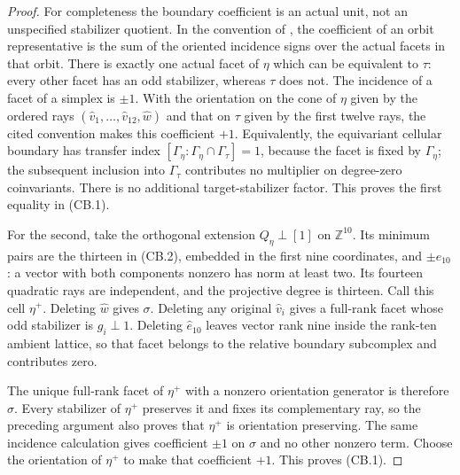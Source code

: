\documentclass[11pt,a4paper]{article}
\theoremstyle{definition}
\begin{document}
\begin{proof}
For completeness the boundary coefficient is an actual unit,
not an unspecified stabilizer quotient. In the convention of
\cite[\S1.2.1, equations~(1)--(2), p.~4]{DEKM2026}, the coefficient
of an orbit representative is the sum of the oriented incidence
signs over the actual facets in that orbit. There is exactly one
actual facet of $\eta$ which can be equivalent to $\tau$: every
other facet has an odd stabilizer, whereas $\tau$ does not.
The incidence of a facet of a simplex is $\pm1$. With the
orientation on the cone of $\eta$ given by the ordered rays
$(\widehat v_1,\ldots,\widehat v_{12},\widehat w)$ and that on
$\tau$ given by the first twelve rays, the cited convention
makes this coefficient $+1$. Equivalently, the equivariant
cellular boundary has transfer index
$[\Gamma_\eta:\Gamma_\eta\cap\Gamma_\tau]=1$, because the facet
is fixed by $\Gamma_\eta$; the subsequent inclusion into
$\Gamma_\tau$ contributes no multiplier on degree-zero
coinvariants. There is no additional target-stabilizer factor.
This proves the first equality in (CB.1).

For the second, take the orthogonal extension
$Q_\eta\perp[1]$ on $\mathbb Z^{10}$. Its minimum pairs are
the thirteen in (CB.2), embedded in the first nine coordinates,
and $\pm e_{10}$: a vector with both components nonzero has
norm at least two. Its fourteen quadratic rays are independent,
and the projective degree is thirteen. Call this cell $\eta^+$.
Deleting $\widehat w$ gives $\sigma$. Deleting any original
$\widehat v_i$ gives a full-rank facet whose odd stabilizer is
$g_i\perp1$. Deleting $\widehat e_{10}$ leaves vector rank nine
inside the rank-ten ambient lattice, so that facet belongs to
the relative boundary subcomplex and contributes zero.

The unique full-rank facet of $\eta^+$ with a nonzero orientation
generator is therefore $\sigma$. Every stabilizer of $\eta^+$
preserves it and fixes its complementary ray, so the preceding
argument also proves that $\eta^+$ is orientation preserving.
The same incidence calculation gives coefficient $\pm1$ on
$\sigma$ and no other nonzero term. Choose the orientation of
$\eta^+$ to make that coefficient $+1$. This proves (CB.1).
\end{proof}
\end{document}
